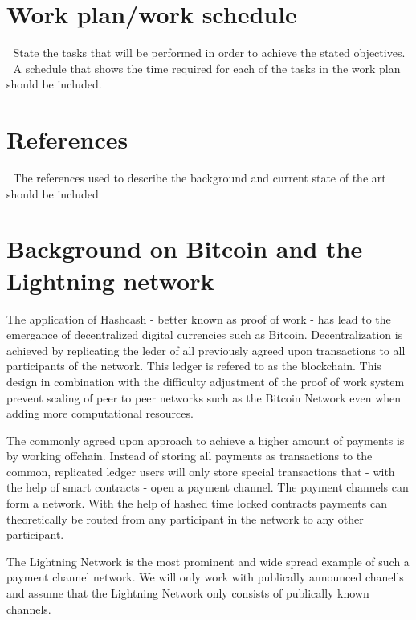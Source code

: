 \documentclass[a4paper,latin]{paper}
\begin{document}
\section{Work plan/work schedule}
 State the tasks that will be performed in order to achieve the stated objectives.
 A schedule that shows the time required for each of the tasks in the work plan should be
included.
\section{References}


 The references used to describe the background and current state of the art should be included

\appendix
\section{Background on Bitcoin and the Lightning network}
The application of Hashcash \cite{back2002hashcash} - better known as proof of work -  has lead to the emergance of decentralized digital currencies such as Bitcoin\cite{nakamoto2008bitcoin}.
Decentralization is achieved by replicating the leder of all previously agreed upon transactions to all participants of the network.
This ledger is refered to as the blockchain.
This design in combination with the difficulty adjustment of the proof of work system prevent scaling of peer to peer networks such as the Bitcoin Network even when adding more computational resources.

The commonly agreed upon approach to achieve a higher amount of payments is by working offchain.
Instead of storing all payments as transactions to the common, replicated ledger users will only store special transactions that - with the help of smart contracts - open a payment channel.
The payment channels can form a network.
With the help of hashed time locked contracts payments can theoretically be routed from any participant in the network to any other participant. 

The Lightning Network is the most prominent and wide spread example of such a payment channel network.
We will only work with publically announced chanells and assume that the Lightning Network only consists of publically known channels.
\end{document}
